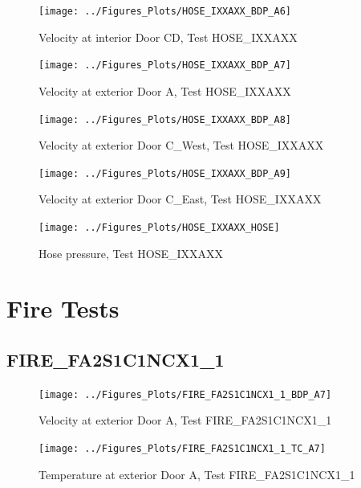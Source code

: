 \documentclass[11pt,oneside]{book}
\begin{document}
\begin{figure}[!ht]
\texttt{[image: ../Figures\_Plots/HOSE\_IXXAXX\_BDP\_A6]}
\caption{Velocity at interior Door CD, Test HOSE\_IXXAXX}
\label{fig:HOSE_IXXAXX_BDP_A6}
\end{figure}

\begin{figure}[!ht]
\texttt{[image: ../Figures\_Plots/HOSE\_IXXAXX\_BDP\_A7]}
\caption{Velocity at exterior Door A, Test HOSE\_IXXAXX}
\label{fig:HOSE_IXXAXX_BDP_A7}
\end{figure}

\begin{figure}[!ht]
\texttt{[image: ../Figures\_Plots/HOSE\_IXXAXX\_BDP\_A8]}
\caption{Velocity at exterior Door C\_West, Test HOSE\_IXXAXX}
\label{fig:HOSE_IXXAXX_BDP_A8}
\end{figure}

\begin{figure}[!ht]
\texttt{[image: ../Figures\_Plots/HOSE\_IXXAXX\_BDP\_A9]}
\caption{Velocity at exterior Door C\_East, Test HOSE\_IXXAXX}
\label{fig:HOSE_IXXAXX_BDP_A9}
\end{figure}

\begin{figure}[!ht]
\texttt{[image: ../Figures\_Plots/HOSE\_IXXAXX\_HOSE]}
\caption{Hose pressure, Test HOSE\_IXXAXX}
\label{fig:HOSE_IXXAXX_HOSE}
\end{figure}


\clearpage


\section{Fire Tests}

\subsection{FIRE\_FA2S1C1NCX1\_1}

\begin{figure}[!ht]
\texttt{[image: ../Figures\_Plots/FIRE\_FA2S1C1NCX1\_1\_BDP\_A7]}
\caption{Velocity at exterior Door A, Test FIRE\_FA2S1C1NCX1\_1}
\label{fig:FIRE_FA2S1C1NCX1_1_BDP_A7}
\end{figure}

\begin{figure}[!ht]
\texttt{[image: ../Figures\_Plots/FIRE\_FA2S1C1NCX1\_1\_TC\_A7]}
\caption{Temperature at exterior Door A, Test FIRE\_FA2S1C1NCX1\_1}
\label{fig:FIRE_FA2S1C1NCX1_1_TC_A7}
\end{figure}
\end{document}
